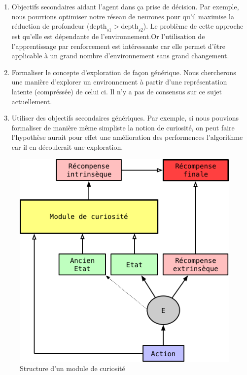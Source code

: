 \begin{enumerate}
    \item Objectifs secondaires aidant l'agent dans ça prise de décision. Par exemple, nous pourrions optimiser notre réseau de neurones pour qu'il maximise la réduction de profondeur ($\text{depth}_{s1} > \text{depth}_{s2}$). Le problème de cette approche est qu'elle est dépendante de l'environnement.Or l'utilisation de l'apprentissage par renforcement est intéressante car elle permet d'être applicable à un grand nombre d'environnement sans grand changement.
    \item Formaliser le concepte d'exploration de façon générique. Nous chercherons une manière d'explorer un environnement à partir d'une représentation latente (compréssée) de celui ci. Il n'y a pas de consensus sur ce sujet actuellement.

    \item Utiliser des objectifs secondaires génériques. Par exemple, si nous pouvions formaliser de manière même simpliste la notion de curiosité, on peut faire l'hypothèse aurait pour effet une amélioration des performences l'algorithme car il en découlerait une exploration.
\end{enumerate}

\begin{figure}[h!]
\begin{center}
    \includegraphics[scale=.5]{./assets/CURIOSITY/curiosity.png}
    \caption{Structure d'un module de curiosité}
\end{center}
\end{figure}

